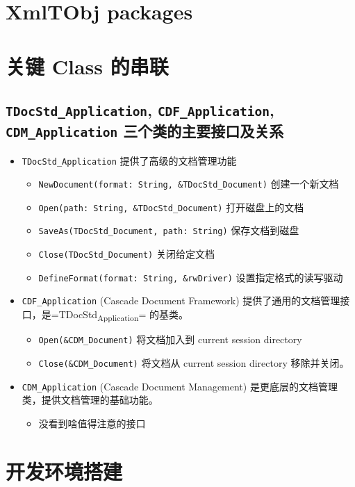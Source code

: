 \documentclass[11pt]{article}
\begin{document}
\section{XmlTObj packages}
\label{sec:org7bd6464}

\section{关键 Class 的串联}
\label{sec:org39b8f0c}

\subsection{\texttt{TDocStd\_Application}, \texttt{CDF\_Application}, \texttt{CDM\_Application} 三个类的主要接口及关系}
\label{sec:orgef86a37}

\begin{itemize}
\item \texttt{TDocStd\_Application} 提供了高级的文档管理功能
\begin{itemize}
\item \texttt{NewDocument(format: String, \&TDocStd\_Document)} 创建一个新文档
\item \texttt{Open(path: String, \&TDocStd\_Document)} 打开磁盘上的文档
\item \texttt{SaveAs(TDocStd\_Document, path: String)} 保存文档到磁盘
\item \texttt{Close(TDocStd\_Document)} 关闭给定文档
\item \texttt{DefineFormat(format: String, \&rwDriver)} 设置指定格式的读写驱动
\end{itemize}
\item \texttt{CDF\_Application} (Cascade Document Framework) 提供了通用的文档管理接口，是=TDocStd\textsubscript{Application}= 的基类。
\begin{itemize}
\item \texttt{Open(\&CDM\_Document)} 将文档加入到 current session directory
\item \texttt{Close(\&CDM\_Document)} 将文档从 current session directory 移除并关闭。
\end{itemize}
\item \texttt{CDM\_Application} (Cascade Document Management) 是更底层的文档管理类，提供文档管理的基础功能。
\begin{itemize}
\item 没看到啥值得注意的接口
\end{itemize}
\end{itemize}
\section{开发环境搭建}
\label{sec:orgdbd96d9}
\end{document}
